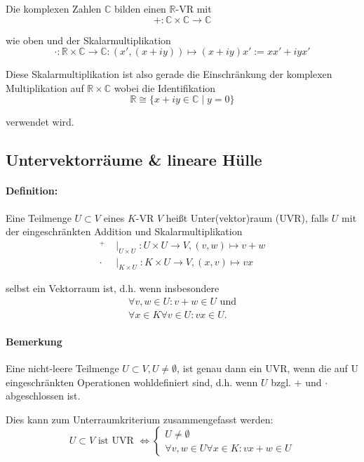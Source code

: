 	Die komplexen Zahlen $\mathbb{C}$ bilden einen $\mathbb{R}$-VR mit
	\begin{equation*}
		+:\mathbb{C}\times\mathbb{C}\to\mathbb{C}
	\end{equation*}

	wie oben und der Skalarmultiplikation
	\begin{equation*}
		\cdot:\mathbb{R}\times\mathbb{C}\to\mathbb{C}:(x',(x+iy))\mapsto(x+iy)x':=xx'+iyx'
	\end{equation*}

	Diese Skalarmultiplikation ist also gerade die Einschränkung der komplexen Multiplikation auf $\mathbb{R}\times\mathbb{C}$ wobei die Identifikation
	\begin{equation*}
		\mathbb{R}\cong \{{x+iy\in\mathbb{C}\mid y=0}\}
	\end{equation*}

	verwendet wird.
\subsection{Untervektorräume \& lineare Hülle}
\paragraph{Definition:}
	Eine Teilmenge $U\subset V$ eines $K$-VR $V$ heißt Unter(vektor)raum (UVR), falls $U$ mit der eingeschränkten Addition und Skalarmultiplikation
	\begin{align*}
		 ^+    & \mid_{U\times U}: U\times U \to V,(v,w) \mapsto v+w \\
		 \cdot & \mid_{K\times U}: K\times U \to V,(x,v) \mapsto vx
	\end{align*}

	selbst ein Vektorraum ist, d.h. wenn insbesondere
	\begin{gather*}
		\forall v,w \in U: v+w\in U \text{ und}\\
		\forall x\in K\forall v\in U: vx\in U.
	\end{gather*}

\paragraph{Bemerkung}
	Eine nicht-leere Teilmenge $U\subset V, U\neq\emptyset$, ist genau dann ein UVR, wenn die auf U eingeschränkten Operationen wohldefiniert sind, d.h. wenn $ U $ bzgl. $ + $ und $ \cdot $ abgeschlossen ist.

	Dies kann zum Unterraumkriterium zusammengefasst werden:
	\begin{equation*}
		U\subset V \text{ ist UVR }\Leftrightarrow 
 		 \begin{cases}
 		 	U\neq\emptyset\\
 		 	\forall v,w\in U\forall x\in K: vx+w\in U
 		 \end{cases}
	\end{equation*}

